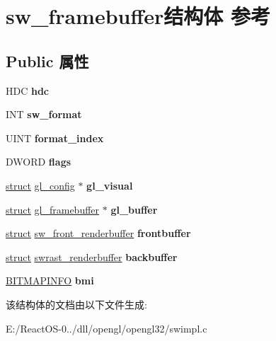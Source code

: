 \hypertarget{structsw__framebuffer}{}\section{sw\+\_\+framebuffer结构体 参考}
\label{structsw__framebuffer}
\subsection*{Public 属性}
\begin{DoxyCompactItemize}
\item 
\mbox{\label{structsw__framebuffer_a721b3a8f7777f21cff6ba5d6c2b86b26}} 
H\+DC {\bfseries hdc}
\item 
\mbox{\label{structsw__framebuffer_a64fd10848b7ca59a9b2b52f76cc8126f}} 
I\+NT {\bfseries sw\+\_\+format}
\item 
\mbox{\label{structsw__framebuffer_ae79e0f1eec23134891b73e9fbbd32a9a}} 
U\+I\+NT {\bfseries format\+\_\+index}
\item 
\mbox{\label{structsw__framebuffer_a0169a3ff9b3ec69f915e399bffa9d2ed}} 
D\+W\+O\+RD {\bfseries flags}
\item 
\mbox{\label{structsw__framebuffer_a405901154131d575cd3895f1264c8fa7}} 
\hyperlink{interfacestruct}{struct} \hyperlink{structgl__config}{gl\+\_\+config} $\ast$ {\bfseries gl\+\_\+visual}
\item 
\mbox{\label{structsw__framebuffer_a7ae410f38dbd5adc7f41cd50b593b70c}} 
\hyperlink{interfacestruct}{struct} \hyperlink{structgl__framebuffer}{gl\+\_\+framebuffer} $\ast$ {\bfseries gl\+\_\+buffer}
\item 
\mbox{\label{structsw__framebuffer_a530318c9fb88f284b287e35b48ea6a44}} 
\hyperlink{interfacestruct}{struct} \hyperlink{structsw__front__renderbuffer}{sw\+\_\+front\+\_\+renderbuffer} {\bfseries frontbuffer}
\item 
\mbox{\label{structsw__framebuffer_abf8146380f7932a0055d83c20db76d44}} 
\hyperlink{interfacestruct}{struct} \hyperlink{structswrast__renderbuffer}{swrast\+\_\+renderbuffer} {\bfseries backbuffer}
\item 
\mbox{\label{structsw__framebuffer_ac217adb0188fc2a796bfab9864461356}} 
\hyperlink{structtag_b_i_t_m_a_p_i_n_f_o}{B\+I\+T\+M\+A\+P\+I\+N\+FO} {\bfseries bmi}
\end{DoxyCompactItemize}


该结构体的文档由以下文件生成\+:\begin{DoxyCompactItemize}
\item 
E\+:/\+React\+O\+S-\/0../dll/opengl/opengl32/swimpl.\+c\end{DoxyCompactItemize}

